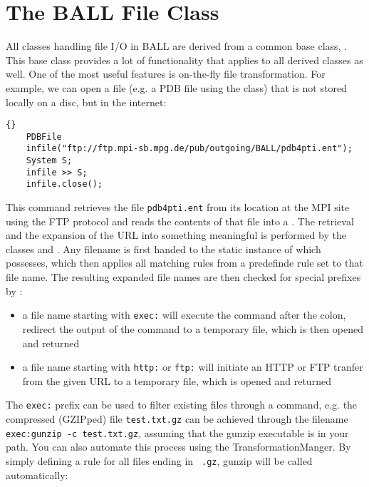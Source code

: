 \section{The BALL File Class}

All classes handling file I/O in BALL are derived from a common
base class, . This base class provides a lot of
functionality that applies to all derived classes as well.
One of the most useful features is on-the-fly file transformation.
For example, we can open a file (e.g. a PDB file using the  
class) that is not stored locally on a disc, but in the internet:

\begin{lstlisting}{}
	PDBFile
	infile("ftp://ftp.mpi-sb.mpg.de/pub/outgoing/BALL/pdb4pti.ent");
	System S;
	infile >> S;
	infile.close();
\end{lstlisting}

\noindent
This command retrieves the file {\tt pdb4pti.ent} from its location at the MPI
site using the FTP protocol and reads the contents of that file into a
. The retrieval and the expansion of the URL into something
meaningful is performed by the classes  and
. Any filename is first handed to the static instance of
 which  possesses, which then applies
all matching rules from a predefinde rule set to that file name. The resulting
expanded file names are then checked for special prefixes by :
\begin{itemize}
	\item a file name starting with {\tt exec:} will execute the command after the
					colon, redirect the output of the command to a temporary file, which 	
					is then opened and returned
	\item a file name starting with {\tt http:} or {\tt ftp:} will initiate
					an HTTP or FTP tranfer from the given URL to a temporary file, which
					is opened and returned
\end{itemize}

\noindent 
The {\tt exec:} prefix can be used to filter existing files through a command, 
e.g. the compressed (GZIPped) file {\tt test.txt.gz} can be achieved through
the filename {\tt exec:gunzip -c test.txt.gz}, assuming that the gunzip
executable is in your path. You can also automate this process using the
TransformationManger. By simply defining a rule for all files ending in {\tt
.gz}, gunzip will be called automatically:

